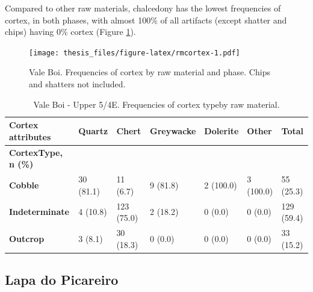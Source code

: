 \documentclass[12pt,twoside]{reedthesis}
\begin{document}
Compared to other raw materials, chalcedony has the lowest frequencies of cortex, in both phases, with almost 100\% of all artifacts (except shatter and chips) having 0\% cortex (Figure \ref{fig:rmcortex}).
\begin{figure}
\centering
\texttt{[image: thesis\_files/figure-latex/rmcortex-1.pdf]}
\caption{\label{fig:rmcortex}Vale Boi. Frequencies of cortex by raw material and phase. Chips and shatters not included.}
\end{figure}
\begin{table}

\caption{\label{tab:cortextab1}Vale Boi - Lower 5. Frequencies of cortex type by raw material.}
\centering
{}
\end{table}
\begin{table}

\caption{\label{tab:cortextab2}Vale Boi - Upper 5/4E. Frequencies of cortex typeby raw material.}
\centering
\begin{tabular}[t]{>{\bfseries}lllllll}
\toprule
Cortex attributes & Quartz & Chert & Greywacke & Dolerite & Other & Total\\
\midrule
CortexType, n (\%) &  &  &  &  &  & \\
Cobble & 30 (81.1) & 11 (6.7) & 9 (81.8) & 2 (100.0) & 3 (100.0) & 55 (25.3)\\
Indeterminate & 4 (10.8) & 123 (75.0) & 2 (18.2) & 0 (0.0) & 0 (0.0) & 129 (59.4)\\
Outcrop & 3 (8.1) & 30 (18.3) & 0 (0.0) & 0 (0.0) & 0 (0.0) & 33 (15.2)\\
\bottomrule
\end{tabular}
\end{table}
\hypertarget{lapa-do-picareiro-3}{%
\subsection{Lapa do Picareiro}\label{lapa-do-picareiro-3}}
\end{document}
